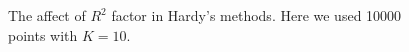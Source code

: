 \documentclass[12pt]{article}
\begin{document}
\begin{figure}[!tbh]
\centering        
   \caption{The affect of $R^{2}$ factor in Hardy's methods. Here we used 10000 points with $K=10$.}
   \label{fig:r21}
\end{figure} 	    
	        
	        	        
\end{document}
